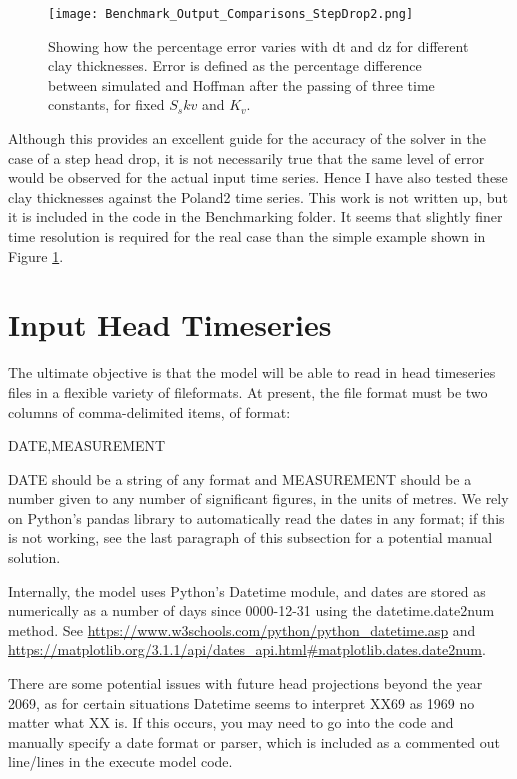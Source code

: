 \documentclass{article}
\begin{document}
\begin{figure}
\center
\texttt{[image: Benchmark\_Output\_Comparisons\_StepDrop2.png]}
\caption{Showing how the percentage error varies with dt and dz for different clay thicknesses. Error is defined as the percentage difference between simulated and Hoffman after the passing of three time constants, for fixed $S_skv$ and $K_v$.}
\label{fig:benchmarking_convergence_all}
\end{figure}

Although this provides an excellent guide for the accuracy of the solver in the case of a step head drop, it is not necessarily true that the same level of error would be observed for the actual input time series. Hence I have also tested these clay thicknesses against the Poland2 time series. This work is not written up, but it is included in the code  in the Benchmarking folder. It seems that slightly finer time resolution is required for the real case than the simple example shown in Figure \ref{fig:benchmarking_convergence_all}.

\section{Input Head Timeseries}

The ultimate objective is that the model will be able to read in head timeseries files in a flexible variety of fileformats. At present, the file format must be two columns of comma-delimited items, of format:

DATE,MEASUREMENT

DATE should be a string of any format and MEASUREMENT should be a number given to any number of significant figures, in the units of metres. We rely on Python's pandas library to automatically read the dates in any format; if this is not working, see the last paragraph of this subsection for a potential manual solution.

Internally, the model uses Python's Datetime module, and dates are stored as numerically as a number of days since 0000-12-31 using the datetime.date2num method. See \url{https://www.w3schools.com/python/python_datetime.asp} and \url{https://matplotlib.org/3.1.1/api/dates_api.html\#matplotlib.dates.date2num}.

There are some potential issues with future head projections beyond the year 2069, as for certain situations Datetime seems to interpret XX69 as 1969 no matter what XX is. If this occurs, you may need to go into the code and manually specify a date format or parser, which is included as a commented out line/lines in the execute model code.
\end{document}
